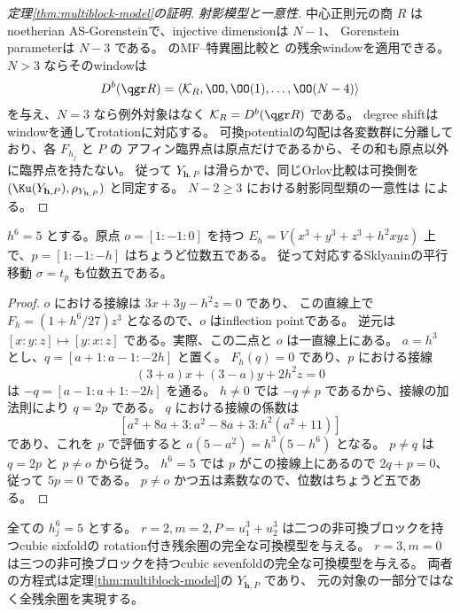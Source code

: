 \begin{proof}[定理\ref{thm:multiblock-model}の証明]
 \emph{射影模型と一意性.}
 中心正則元の商 \(R\) はnoetherian AS-Gorensteinで、injective dimensionは \(N-1\)、
 Gorenstein parameterは \(N-3\) である。
 \cite[Theorem 5.8]{CCKM} のMF--特異圏比較と
 \cite[Theorem 2.5]{Orlov} の残余windowを適用できる。
 \(N>3\) ならそのwindowは
 \[
 D^b(\qgr R)=\langle\mathcal K_R,\OO,\OO(1),\ldots,\OO(N-4)\rangle
 \]
 を与え、\(N=3\) なら例外対象はなく \(\mathcal K_R=D^b(\qgr R)\) である。
 degree shiftはwindowを通してrotationに対応する。
 可換potentialの勾配は各変数群に分離しており、各 \(F_{h_j}\) と \(P\) の
 アフィン臨界点は原点だけであるから、その和も原点以外に臨界点を持たない。
 従って \(Y_{\mathbf h,P}\) は滑らかで、同じOrlov比較は可換側を
 \((\Ku(Y_{\mathbf h,P}),\rho_{Y_{\mathbf h,P}})\) と同定する。
 \(N-2\ge3\) における射影同型類の一意性は
 \cite[Theorem 1.7]{LZ} による。
\end{proof}

\begin{lemma}[位数五の明示的パラメータ]\label{lem:order-five}
 \(h^6=5\) とする。原点 \(o=[1:-1:0]\) を持つ
 \(E_h=V(x^3+y^3+z^3+h^2xyz)\) 上で、\(p=[1:-1:-h]\) はちょうど位数五である。
 従って対応するSklyaninの平行移動 \(\sigma=t_p\) も位数五である。
\end{lemma}
\begin{proof}
 \(o\) における接線は \(3x+3y-h^2z=0\) であり、
 この直線上で \(F_h=(1+h^6/27)z^3\) となるので、\(o\) はinflection pointである。
 逆元は \([x:y:z]\mapsto[y:x:z]\) である。実際、この二点と \(o\) は一直線上にある。
 \(a=h^3\) とし、\(q=[a+1:a-1:-2h]\) と置く。
 \(F_h(q)=0\) であり、\(p\) における接線
 \[
 (3+a)x+(3-a)y+2h^2z=0
 \]
 は \(-q=[a-1:a+1:-2h]\) を通る。
 \(h\ne0\) では \(-q\ne p\) であるから、接線の加法則により \(q=2p\) である。
 \(q\) における接線の係数は
 \[
 [a^2+8a+3:a^2-8a+3:h^2(a^2+11)]
 \]
 であり、これを \(p\) で評価すると \(a(5-a^2)=h^3(5-h^6)\) となる。
 \(p\ne q\) は \(q=2p\) と \(p\ne o\) から従う。
 \(h^6=5\) では \(p\) がこの接線上にあるので \(2q+p=0\)、従って \(5p=0\) である。
 \(p\ne o\) かつ五は素数なので、位数はちょうど五である。
\end{proof}

\begin{remark}
 全ての \(h_j^6=5\) とする。
 \(r=2,m=2,P=u_1^3+u_2^3\) は二つの非可換ブロックを持つcubic sixfoldの
 rotation付き残余圏の完全な可換模型を与える。
 \(r=3,m=0\) は三つの非可換ブロックを持つcubic sevenfoldの完全な可換模型を与える。
 両者の方程式は定理\ref{thm:multiblock-model}の \(Y_{\mathbf h,P}\) であり、
 元の対象の一部分ではなく全残余圏を実現する。
\end{remark}

